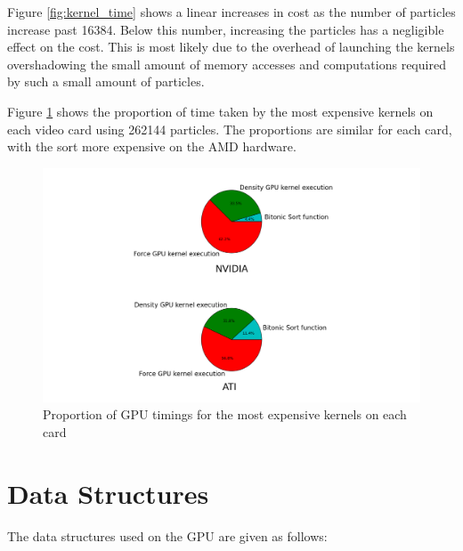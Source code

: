 Figure \ref{fig:kernel_time} shows a linear increases in cost as the number of
particles increase past 16384. Below this number, increasing the particles has a
negligible effect on the cost. This is most likely due to the overhead of
launching the kernels overshadowing the small amount of memory accesses and
computations required by such a small amount of particles. 


Figure \ref{fig:pies} shows the proportion of time taken by the most expensive
kernels on each video card using 262144 particles. The proportions are similar
for each card, with the sort more expensive on the AMD hardware.

\begin{figure}[!htbp]
 		\centering
		\includegraphics[width=\columnwidth]{figures/nv_ati_pie.png}
        \caption{ Proportion of GPU timings for the most expensive kernels on each card }
        \label{fig:pies}
\end{figure}


\clearpage
\newpage




\section{Data Structures}
The data structures used on the GPU are given as follows:


